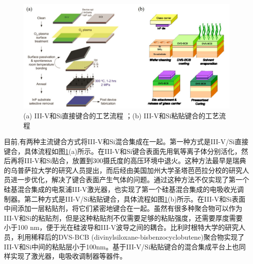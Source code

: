 \begin{figure}[htb]
	\centering
	\includegraphics[width=14cm]{./Pictures/fig_bonding_methods.jpg}
	\caption{ (a) III-V和Si直接键合的工艺流程 \cite{liang2010hybrid, roelkens2010iii}；(b) III-V和Si粘贴键合的工艺流程 \cite{liang2010hybrid, roelkens2010iii}}
\label{fig_bonding_methods}
\end{figure}

目前,有两种主流键合方式将III-V和Si混合集成在一起。第一种方式是III-V/Si直接键合，具体流程如图\ref{fig_bonding_methods}(a)所示。在III-V和Si键合表面先用氧等离子体分别活化，然后再将III-V和Si贴合，放置到300摄氏度的高压环境中退火。这种方法最早是瑞典的乌普萨拉大学的研究人员提出\cite{pasquariello2002plasma}，而后经由美国加州大学圣塔芭芭拉分校的研究人员进一步优化\cite{liang2010hybrid}，解决了键合表面产生气体的问题。通过这种方法不仅实现了第一个硅基混合集成的电泵浦III-V激光器\cite{fang2006electrically}，也实现了第一个硅基混合集成的电吸收光调制器\cite{kuo2008high}。第二种方式是III-V/Si粘贴键合，具体流程如图\ref{fig_bonding_methods}(b)所示。在III-V和Si表面中间添加一层粘贴剂，将它们紧密地键合在一起。虽然有很多种聚合物可以作为III-V和Si的粘贴剂，但是这种粘贴剂不仅需要足够的粘贴强度，还需要厚度需要小于100 nm，便于光在硅波导和III-V波导之间的耦合。比利时根特大学的研究人员，利用稀释后的DVS-BCB (divinylsiloxane-bisbenzocyclobutene)聚合物实现了III-V和Si中间的粘贴层小于100nm\cite{liang2010hybrid, roelkens2010iii}。基于III-V/Si粘贴键合的混合集成平台上也同样实现了激光器，电吸收调制器等器件\cite{roelkens2015iii}。

